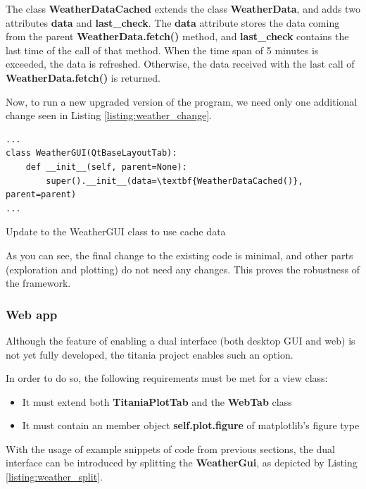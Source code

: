 The class \textbf{WeatherDataCached} extends the class \textbf{WeatherData}, and adds two attributes \textbf{data} and \textbf{last\_check}.
The  \textbf{data} attribute stores the data coming from the parent \textbf{WeatherData.fetch()} method, and  \textbf{last\_check} contains the last time of the call of that method.
When the time span of 5 minutes is exceeded, the data is refreshed. Otherwise, the data received with the last call of \textbf{WeatherData.fetch()} is returned.

Now, to run a new upgraded version of the program, we need only one additional change seen in Listing \ref{listing:weather_change}.

\begin{listing}[!ht]
\begin{verbatim}
...
class WeatherGUI(QtBaseLayoutTab):
    def __init__(self, parent=None):
        super().__init__(data=\textbf{WeatherDataCached()}, parent=parent)
...

\end{verbatim}
\caption{Update to the WeatherGUI class to use cache data}
\label{listing:weather_change}
\end{listing}

As you can see, the final change to the existing code is minimal, and other parts (exploration and plotting) do not need any changes. This proves the robustness of the framework.

\subsubsection{Web app}
Although the feature of enabling a dual interface (both desktop GUI and web) is not yet fully developed, the titania project enables such an option.

In order to do so, the following requirements must be met for a view class:
\begin{itemize}
  \item It must extend both \textbf{TitaniaPlotTab} and the \textbf{WebTab} class
  \item It must contain an member object \textbf{self.plot.figure} of matplotlib's figure type
\end{itemize}

With the usage of example snippets of code from previous sections, the dual interface can be introduced by splitting the \textbf{WeatherGui}, as depicted by Listing \ref{listing:weather_split}.


